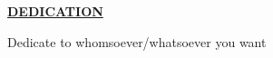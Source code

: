 {\centering {}\fontsize{18pt}{27pt}\selectfont \textbf{\underline{DEDICATION}} \par} 
\vspace*{\fill}
\begin{center}
	Dedicate to whomsoever/whatsoever you want
\end{center}
\vspace*{\fill}